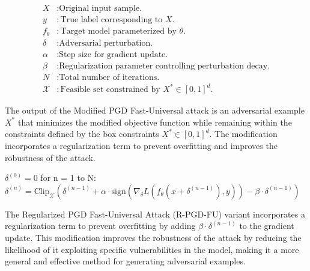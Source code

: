 \[
\begin{aligned}
X & : \text{Original input sample.} \\
y & : \text{True label corresponding to } X. \\
f_\theta & : \text{Target model parameterized by } \theta. \\
\delta & : \text{Adversarial perturbation.} \\
\alpha & : \text{Step size for gradient update.} \\
\beta & : \text{Regularization parameter controlling perturbation decay.} \\
N & : \text{Total number of iterations.} \\
\mathcal{X} & : \text{Feasible set constrained by } X^* \in [0,1]^d.
\end{aligned}
\]

The output of the Modified PGD Fast-Universal attack is an adversarial example $X^*$ that minimizes the modified objective function while remaining within the constraints defined by the box constraints $X^* \in [0, 1]^d$. 
The modification incorporates a regularization term to prevent overfitting and improves the robustness of the attack.

$\delta^{(0)} = 0$
for n = 1 to N:
    $\delta^{(n)} = \text{Clip}_{\mathcal{X}} \left( \delta^{(n-1)} + \alpha \cdot \text{sign} \left( \nabla_\delta L(f_\theta(x + \delta^{(n-1)}), y) \right) - \beta \cdot \delta^{(n-1)} \right)$

The Regularized PGD Fast-Universal Attack (R-PGD-FU) variant incorporates a regularization term to prevent overfitting by adding $\beta \cdot \delta^{(n-1)}$ to the gradient update. This modification improves the robustness of the attack by reducing the likelihood of it exploiting specific vulnerabilities in the model, making it a more general and effective method for generating adversarial examples.